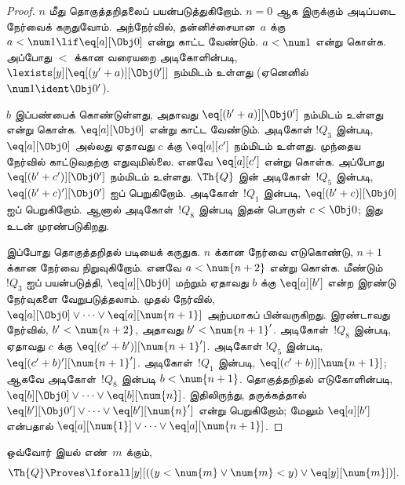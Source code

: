 \documentclass[../../../include/open-logic-section]{subfiles}
\begin{document}
\begin{proof}
$n$ மீது தொகுத்தறிதலைப் பயன்படுத்துகிறோம். $n = 0$ ஆக இருக்கும் அடிப்படை
நேர்வைக் கருதுவோம். அந்நேர்வில், தன்னிச்சையான~$a$ க்கு
$a < \num 1 \lif \eq[a][\Obj 0]$ என்று காட்ட வேண்டும். $a < \num 1$
என்று கொள்க. அப்போது $<$ க்கான வரையறை அடிகோளின்படி,
$\lexists[y][\eq[(y'+a)][\Obj 0']]$ நம்மிடம் உள்ளது (ஏனெனில்
$\num 1 \ident \Obj 0'$).

$b$ இப்பண்பைக் கொண்டுள்ளது, அதாவது $\eq[(b'+a)][\Obj 0']$ நம்மிடம்
உள்ளது என்று கொள்க. $\eq[a][\Obj 0]$ என்று காட்ட வேண்டும். அடிகோள்
$!Q_3$ இன்படி, $\eq[a][\Obj 0]$ அல்லது ஏதாவது $c$ க்கு
$\eq[a][c']$ நம்மிடம் உள்ளது. முந்தைய நேர்வில் காட்டுவதற்கு எதுவுமில்லை.
எனவே $\eq[a][c']$ என்று கொள்க. அப்போது
$\eq[(b' + c')][\Obj 0']$ நம்மிடம் உள்ளது. $\Th{Q}$ இன் அடிகோள்~$!Q_5$
இன்படி, $\eq[(b'+c)'][\Obj 0']$ ஐப் பெறுகிறோம். அடிகோள்~$!Q_1$ இன்படி,
$\eq[(b' + c)][\Obj 0]$ ஐப் பெறுகிறோம். ஆனால் அடிகோள்~$!Q_8$ இன்படி
இதன் பொருள் $c < \Obj 0$; இது  உடன் முரண்படுகிறது.

இப்போது தொகுத்தறிதல் படியைக் கருதுக. $n$ க்கான நேர்வை எடுகொண்டு,
$n+1$ க்கான நேர்வை நிறுவுகிறோம். எனவே $a < \num {n+2}$ என்று கொள்க.
மீண்டும் $!Q_3$ ஐப் பயன்படுத்தி, $\eq[a][\Obj 0]$ மற்றும் ஏதாவது $b$
க்கு $\eq[a][b']$ என்ற இரண்டு நேர்வுகளை வேறுபடுத்தலாம். முதல் நேர்வில்,
$\eq[a][\Obj 0] \lor \dots \lor \eq[a][\num{n+1}]$ அற்பமாகப்
பின்வருகிறது. இரண்டாவது நேர்வில், $b' < \num {n+2}$, அதாவது
$b' < \num{n+1}'$. அடிகோள்~$!Q_8$ இன்படி, ஏதாவது $c$ க்கு
$\eq[(c'+b')][\num{n+1}']$. அடிகோள் $!Q_5$ இன்படி,
$\eq[(c'+b)'][\num{n+1}']$. அடிகோள்~$!Q_1$ இன்படி,
$\eq[(c'+b)][\num{n+1}]$; ஆகவே அடிகோள்~$!Q_8$ இன்படி
$b < \num{n+1}$. தொகுத்தறிதல் எடுகோளின்படி,
$\eq[b][\Obj 0] \lor \dots \lor \eq[b][\num{n}]$. இதிலிருந்து,
தருக்கத்தால் $\eq[b'][\Obj 0'] \lor \dots \lor \eq[b'][\num{n}']$
என்று பெறுகிறோம்; மேலும் $\eq[a][b']$ என்பதால்
$\eq[a][\num{1}] \lor \dots \lor \eq[a][\num{n+1}]$.
\end{proof}

\begin{lem}
   ஒவ்வோர் இயல் எண்~$m$ க்கும்,
  \[
  \Th{Q} \Proves
  \lforall[y][((y < \num{m} \lor \num{m} < y) \lor \eq[y][\num{m}])].
  \]
\end{lem}
\end{document}
